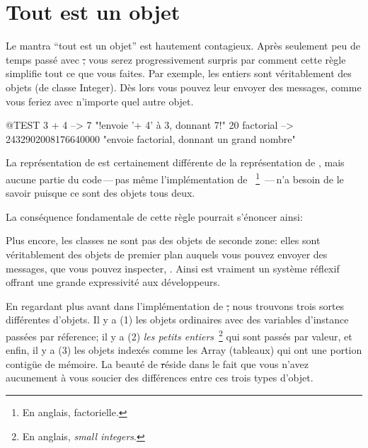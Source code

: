 \documentclass[a4paper,10pt,twoside]{book}
\begin{document}
\section{Tout est un objet}


Le mantra ``tout est un objet'' est hautement contagieux.
Apr\`es seulement peu de temps pass\'e avec \st, vous serez progressivement surpris par comment cette r\`egle simplifie tout ce que vous faites.
Par exemple, les entiers sont v\'eritablement des objets (de classe Integer). D\`es lors vous pouvez leur envoyer des messages, comme vous feriez avec n'importe quel autre objet.

\begin{code}{@TEST}
3 + 4            --> 7    "!envoie '+ 4' \`a 3, donnant 7!"
20 factorial  --> 2432902008176640000   "envoie factorial, donnant un grand nombre"
\end{code}

La repr\'esentation de  est certainement diff\'erente de la repr\'esentation de , mais aucune partie du code\,---\,pas m\^eme l'impl\'ementation de 
~\footnote{En anglais, factorielle.}
\,---\,n'a besoin de le savoir puisque ce sont des objets tous deux.

La cons\'equence fondamentale de cette r\`egle pourrait s'\'enoncer ainsi:

Plus encore, les classes ne sont pas des objets de seconde zone: elles sont v\'eritablement des objets de premier plan auquels vous pouvez envoyer des messages, que vous pouvez inspecter, \etc.
Ainsi \squeak est vraiment un syst\`eme r\'eflexif offrant une grande expressivit\'e
aux développeurs.

En regardant plus avant dans l'impl\'ementation de \st, nous trouvons
trois sortes diff\'erentes d'objets. Il y a (1) les objets ordinaires
avec des variables d'instance pass\'ees par r\'eference; il y a (2)
\emph{les petits entiers}~\footnote{En anglais, \emph{small
    integers}.} qui sont pass\'es par valeur, et enfin, il y a (3) les
objets 
index\'es comme les Array (tableaux) qui ont une portion contig\"ue de m\'emoire. La beaut\'e de \st r\'eside 
dans le fait que vous n'avez aucunement \`a vous soucier des diff\'erences entre ces trois types
d'objet.


\end{document}
